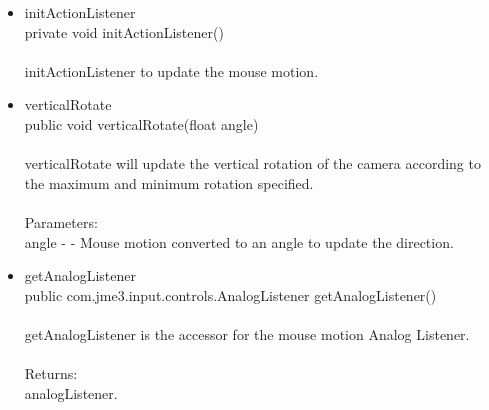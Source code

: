 \documentclass[letterpaper]{article}
\begin{document}
\begin{itemize}
								\begin{itemize}
									\item	initActionListener \\
											private void initActionListener() \\ \\
											initActionListener to update the mouse motion.
									\item	verticalRotate \\
											public void verticalRotate(float angle) \\ \\
											verticalRotate will update the vertical rotation of the camera according to the maximum and minimum rotation specified. \\ \\
											Parameters: \\
											angle - - Mouse motion converted to an angle to update the direction.
									\item	getAnalogListener \\
											public com.jme3.input.controls.AnalogListener getAnalogListener() \\ \\
											getAnalogListener is the accessor for the mouse motion Analog Listener. \\ \\
											Returns: \\
											analogListener.
								\end{itemize}
					\end{itemize}
				
				\vspace{0.2in}
\end{document}
